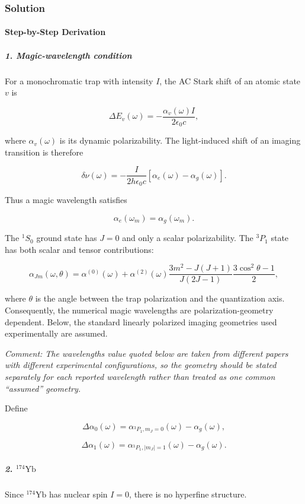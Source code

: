 \subsubsection*{Solution}
\paragraph*{Step-by-Step Derivation}

\subparagraph*{1. Magic-wavelength condition}

For a monochromatic trap with intensity $I$, the AC Stark shift of an atomic state $v$ is

\[
\Delta E_v(\omega) = -\frac{\alpha_v(\omega)I}{2\epsilon_0c},
\]

where $\alpha_v(\omega)$ is its dynamic polarizability. The light-induced shift of an imaging transition is therefore

\[
\delta\nu(\omega) = -\frac{I}{2h\epsilon_0c} \left[\alpha_e(\omega)-\alpha_g(\omega)\right].
\]

Thus a magic wavelength satisfies

\[
{\alpha_e(\omega_m)=\alpha_g(\omega_m)}.
\]

The $^1S_0$ ground state has $J=0$ and only a scalar polarizability. The $^3P_1$ state has both scalar and tensor contributions:

\[
\alpha_{Jm}(\omega,\theta) = \alpha^{(0)}(\omega) + \alpha^{(2)}(\omega) \frac{3m^2-J(J+1)}{J(2J-1)} \frac{3\cos^2\theta-1}{2},
\]

where $\theta$ is the angle between the trap polarization and the quantization axis. Consequently, the numerical magic wavelengths are polarization-geometry dependent. Below, the standard linearly polarized imaging geometries used experimentally are assumed.

{\textit{Comment: The wavelengths value quoted below are taken from different papers with different experimental configurations, so the geometry should be stated separately for each reported wavelength rather than treated as one common ``assumed'' geometry.}}

Define

\[
\Delta\alpha_0(\omega) = \alpha_{^3P_1,m_J=0}(\omega)-\alpha_g(\omega),
\]

\[
\Delta\alpha_1(\omega) = \alpha_{^3P_1,|m_J|=1}(\omega)-\alpha_g(\omega).
\]

\subparagraph*{2. $^{174}\mathrm{Yb}$}

Since $^{174}\mathrm{Yb}$ has nuclear spin $I=0$, there is no hyperfine structure.

